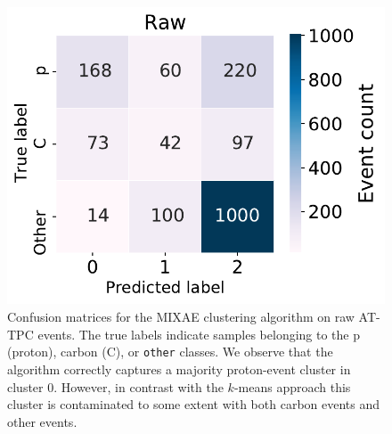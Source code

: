 \documentclass[preprint,12pt]{elsarticle}
\begin{document}
\begin{figure}
\centering
	\includegraphics[width=\textwidth]{custom_work/Raw_mixae_conf_mat.pdf}
\caption[MIXAE - confusion matrices]{Confusion matrices for the MIXAE clustering algorithm on raw AT-TPC events. The true labels indicate samples belonging to the p (proton), carbon (C), or \texttt{other} classes. We observe that the algorithm correctly captures a majority proton-event cluster in cluster 0. However, in contrast with the $k$-means approach this cluster is contaminated to some extent with both carbon events and other events. }\label{fig:mixae_confmat_raw}
\end{figure}



\end{document}
